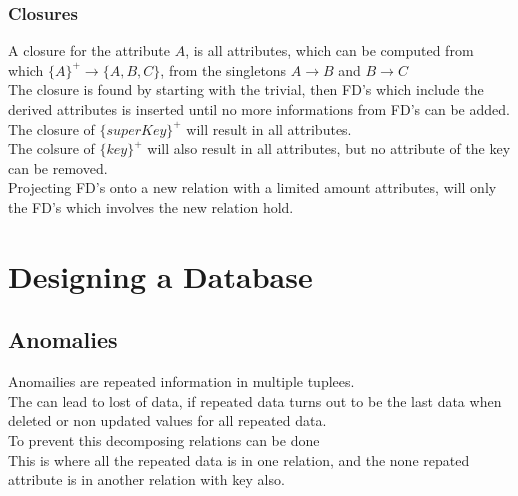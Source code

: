 \documentclass[12pt, a4paper]{article}
\begin{document}
		\subsubsection{Closures}
				  A closure for the attribute $A$, is all attributes, which can be computed from which $\{A\}^+\rightarrow \{A,B,C\}$, from the singletons $A\rightarrow B$ and $B\rightarrow C$\\
				  The closure is found by starting with the trivial, then FD's which include the derived attributes is inserted until no more informations from FD's can be added.\\
				  The closure of $\{superKey\}^+$ will result in all attributes.\\
				  The colsure of $\{key\}^+$ will also result in all attributes, but no attribute of the key can be removed.\\
				  Projecting FD's onto a new relation with a limited amount attributes, will only the FD's which involves the new relation hold.
	\section{Designing a Database}
		\subsection{Anomalies}
			Anomailies are repeated information in multiple tuplees.\\
			The can lead to lost of data, if repeated data turns out to be the last data when deleted or non updated values for all repeated data.\\
			To prevent this decomposing relations can be done\\
			This is where all the repeated data is in one relation, and the none repated attribute is in another relation with key also.\\
\end{document}
